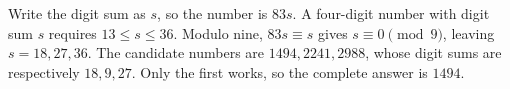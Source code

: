 Write the digit sum as $s$, so the number is $83s$. A four-digit number with digit sum $s$ requires $13\le s\le36$. Modulo nine, $83s\equiv s$ gives $s\equiv0\pmod9$, leaving $s=18,27,36$. The candidate numbers are $1494,2241,2988$, whose digit sums are respectively $18,9,27$. Only the first works, so the complete answer is $\boxed{1494}$.
